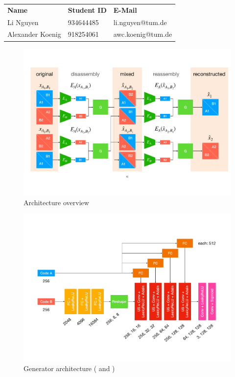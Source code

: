 \documentclass{article}
\begin{document}
\begin{table}[!h]
\center
\begin{tabular}{|l|l|l|}
\hline
\textbf{Name}             & \textbf{Student ID} & \textbf{E-Mail}            \\ \hhline{|=|=|=|}
Li Nguyen        & 934644485  & li.nguyen@tum.de  \\ \hline
Alexander Koenig & 918254061  & awc.koenig@tum.de \\ \hline
\end{tabular}
\end{table}

\begin{figure}[h!]
	\centering 
	\includegraphics[width=0.9\linewidth]{figures/g2g}
	\caption{Architecture overview}
	\label{fig:g2g}
\end{figure}
\begin{figure}[t]
	\centering 
	\includegraphics[width=0.9\linewidth]{figures/generator}
	\caption{Generator architecture (\cite{gabbay2020lord} and \cite{LORD})}
	\label{fig:generator}
\end{figure}
\end{document}
